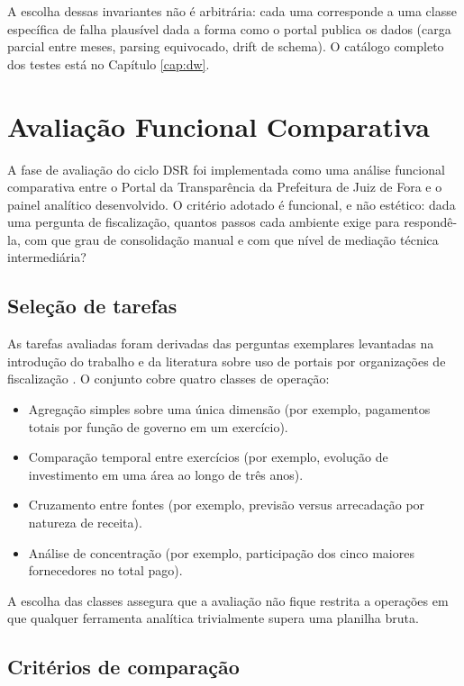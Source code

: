 A escolha dessas invariantes não é arbitrária: cada uma corresponde a uma
classe específica de falha plausível dada a forma como o portal publica
os dados (carga parcial entre meses, parsing equivocado, drift de
schema). O catálogo completo dos testes está no Capítulo \ref{cap:dw}.

\section{Avaliação Funcional Comparativa}
\label{sec:metodo_avaliacao}

A fase de avaliação do ciclo DSR foi implementada como uma análise
funcional comparativa entre o Portal da Transparência da Prefeitura de
Juiz de Fora e o painel analítico desenvolvido. O critério adotado é
funcional, e não estético: dada uma pergunta de fiscalização, quantos
passos cada ambiente exige para respondê-la, com que grau de
consolidação manual e com que nível de mediação técnica intermediária?

\subsection*{Seleção de tarefas}

As tarefas avaliadas foram derivadas das perguntas exemplares levantadas
na introdução do trabalho e da literatura sobre uso de portais por organizações de fiscalização \cite{marco2022transparencia}. O conjunto cobre quatro classes de operação:

\begin{itemize}
    \item Agregação simples sobre uma única dimensão (por exemplo,
    pagamentos totais por função de governo em um exercício).
    \item Comparação temporal entre exercícios (por exemplo, evolução de
    investimento em uma área ao longo de três anos).
    \item Cruzamento entre fontes (por exemplo, previsão versus
    arrecadação por natureza de receita).
    \item Análise de concentração (por exemplo, participação dos cinco
    maiores fornecedores no total pago).
\end{itemize}

A escolha das classes assegura que a avaliação não fique restrita a
operações em que qualquer ferramenta analítica trivialmente supera uma
planilha bruta.

\subsection*{Critérios de comparação}

